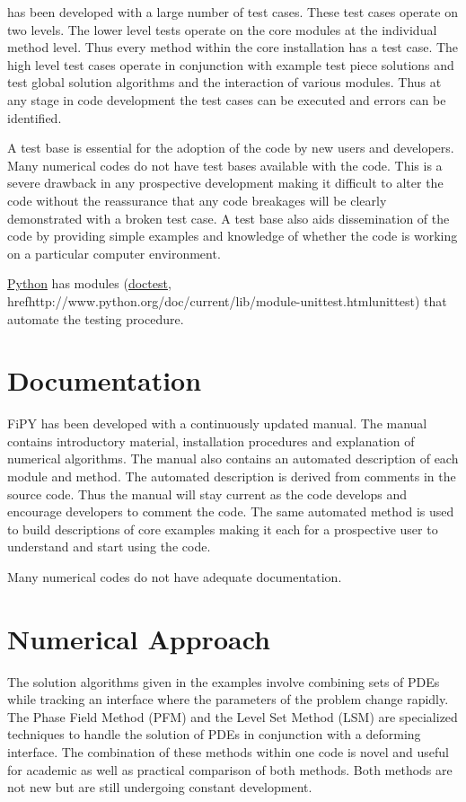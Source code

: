 \FiPy{} has been developed with a large number of test cases. These test
cases operate on two levels. The lower level tests operate on the core
modules at the individual method level. Thus every method within the
core installation has a test case. The high level test cases operate
in conjunction with example test piece solutions and test global
solution algorithms and the interaction of various modules. Thus at
any stage in code development the test cases can be executed and
errors can be identified.

A test base is essential for the adoption of the code by new users and
developers. Many numerical codes do not have test bases available with
the code. This is a severe drawback in any prospective development
making it difficult to alter the code without the reassurance that any
code breakages will be clearly demonstrated with a broken test case. A
test base also aids dissemination of the code by providing simple
examples and knowledge of whether the code is working on a particular
computer environment.

\href{http://www.python.org/}{Python} has modules
(\href{http://www.python.org/doc/current/lib/module-doctest.html}{doctest},
href{http://www.python.org/doc/current/lib/module-unittest.html}{unittest})
that automate the testing procedure.

\section{Documentation}

FiPY has been developed with a continuously updated manual. The manual
contains introductory material, installation procedures and
explanation of numerical algorithms. The manual also contains an
automated description of each module and method. The automated
description is derived from comments in the source code. Thus the
manual will stay current as the code develops and encourage developers
to comment the code. The same automated method is used to build
descriptions of core examples making it each for a prospective user to
understand and start using the code.

Many numerical codes do not have adequate documentation.

\section{Numerical Approach}

The solution algorithms given in the \FiPy{} examples involve combining
sets of PDEs while tracking an interface where the parameters of the
problem change rapidly. The Phase Field Method (PFM) and the Level Set
Method (LSM) are specialized techniques to handle the solution of
PDEs in conjunction with a deforming interface. The combination of
these methods within one code is novel and useful for academic as well
as practical comparison of both methods. Both methods are not new but
are still undergoing constant development.

